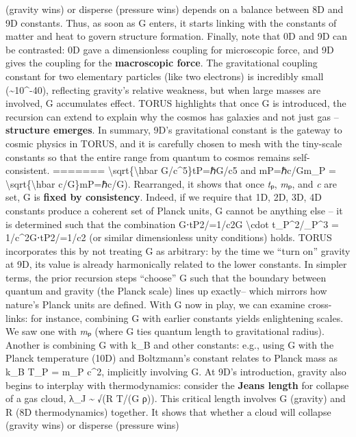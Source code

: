 \documentclass[]{article}
\begin{document}
(gravity wins) or disperse (pressure wins) depends on a balance between
8D and 9D constants. Thus, as soon as G enters, it starts linking with
the constants of matter and heat to govern structure formation. Finally,
note that 0D and 9D can be contrasted: 0D gave a dimensionless coupling
for microscopic force, and 9D gives the coupling for the
\textbf{macroscopic force}. The gravitational coupling constant for two
elementary particles (like two electrons) is incredibly small
(\textasciitilde10\^{}-40), reflecting gravity's relative weakness, but
when large masses are involved, G accumulates effect. TORUS highlights
that once G is introduced, the recursion can extend to explain why the
cosmos has galaxies and not just gas -- \textbf{structure emerges}. In
summary, 9D's gravitational constant is the gateway to cosmic physics in
TORUS, and it is carefully chosen to mesh with the tiny-scale constants
so that the entire range from quantum to cosmos remains self-consistent.
=======
\textbackslash{}sqrt\{\textbackslash{}hbar G/c\^{}5\}tP​=ℏG/c5​ and
mP=ℏc/Gm\_P = \textbackslash{}sqrt\{\textbackslash{}hbar
c/G\}mP​=ℏc/G​). Rearranged, it shows that once \emph{t}ₚ, \emph{m}ₚ,
and \emph{c} are set, G is \textbf{fixed by consistency}​. Indeed, if we
require that 1D, 2D, 3D, 4D constants produce a coherent set of Planck
units, G cannot be anything else -- it is determined such that the
combination G⋅tP2/=1/c2G \textbackslash{}cdot t\_P\^{}2/\ell\_P\^{}3 =
1/c\^{}2G⋅tP2​/​=1/c2 (or similar dimensionless unity conditions)
holds​. TORUS incorporates this by not treating G as arbitrary: by the
time we ``turn on'' gravity at 9D, its value is already harmonically
related to the lower constants​. In simpler terms, the prior recursion
steps ``choose'' G such that the boundary between quantum and gravity
(the Planck scale) lines up exactly​-- which mirrors how nature's Planck
units are defined. With G now in play, we can examine cross-links: for
instance, combining G with earlier constants yields enlightening scales.
We saw one with \emph{m}ₚ (where G ties quantum length to gravitational
radius). Another is combining G with k\_B and other constants: e.g.,
using G with the Planck temperature (10D) and Boltzmann's constant
relates to Planck mass as k\_B T\_P = m\_P c\^{}2, implicitly involving
G​. At 9D's introduction, gravity also begins to interplay with
thermodynamics: consider the \textbf{Jeans length} for collapse of a gas
cloud, λ\_J \textasciitilde{} √(R T/(G ρ)). This critical length
involves G (gravity) and R (8D thermodynamics) together​. It shows that
whether a cloud will collapse (gravity wins) or disperse (pressure wins)
\end{document}
